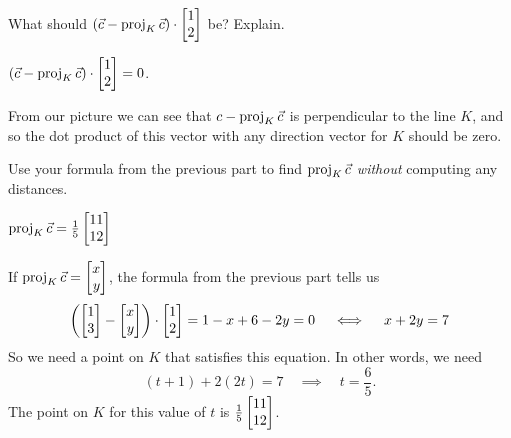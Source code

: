\documentclass{workbook}
\begin{document}
\begin{slide}
\begin{parts}
\begin{solution}
			\end{solution}
		\item What should $(\vec c-\Proj_K\vec c)\cdot \mat{1\\2}$ be? Explain.
			\begin{solution}
				$(\vec c-\Proj_K\vec c)\cdot \mat{1\\2} = 0$.

				From our picture we can see that $c-\operatorname{proj}_K\vec c$ is perpendicular
				to the line $K$, and so the dot product of this vector with any
				direction vector for $K$ should be zero.
			\end{solution}
		\item Use your formula from the previous part to find $\operatorname{proj}_K\vec c$
			\emph{without} computing any distances.
			\begin{solution}
				$\Proj_K\vec c = \frac{1}{5}\mat{11\\12}$

				If $\Proj_K\vec c = \mat{x\\y}$, the formula from the previous
				part tells us
				\[
					\left(\mat{1\\3}-\mat{x\\y}\right)\cdot \mat{1\\2}
					=1-x+6-2y=0
					\quad \iff \quad
					x+2y=7
				\]
				So we need a point on $K$ that satisfies this equation. In other
				words, we need
				\[
					(t+1) + 2(2t) = 7 \quad \implies \quad t = \frac{6}{5}.
				\]
				The point on $K$ for this value of $t$ is $\frac{1}{5}\mat{11\\12}$.
			\end{solution}
	\end{parts}
\end{slide}
\end{document}
